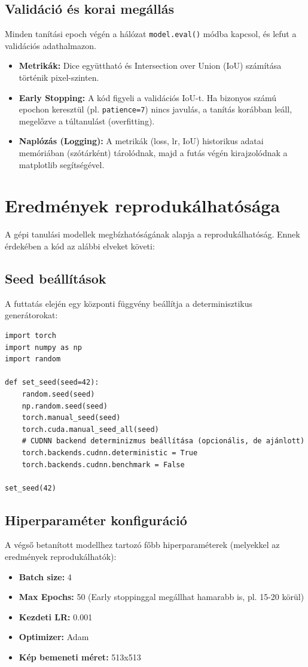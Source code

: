 \documentclass[12pt, a4paper]{report}
\begin{document}
\subsection{Validáció és korai megállás}
Minden tanítási epoch végén a hálózat \texttt{model.eval()} módba kapcsol, és lefut a validációs adathalmazon.
\begin{itemize}
    \item \textbf{Metrikák:} Dice együttható és Intersection over Union (IoU) számítása történik pixel-szinten.
    \item \textbf{Early Stopping:} A kód figyeli a validációs IoU-t. Ha bizonyos számú epochon keresztül (pl. \texttt{patience=7}) nincs javulás, a tanítás korábban leáll, megelőzve a túltanulást (overfitting).
    \item \textbf{Naplózás (Logging):} A metrikák (loss, lr, IoU) historikus adatai memóriában (szótárként) tárolódnak, majd a futás végén kirajzolódnak a matplotlib segítségével.
\end{itemize}

\section{Eredmények reprodukálhatósága}

A gépi tanulási modellek megbízhatóságának alapja a reprodukálhatóság. Ennek érdekében a kód az alábbi elveket követi:

\subsection{Seed beállítások}
A futtatás elején egy központi függvény beállítja a determinisztikus generátorokat:
\begin{verbatim}
import torch
import numpy as np
import random

def set_seed(seed=42):
    random.seed(seed)
    np.random.seed(seed)
    torch.manual_seed(seed)
    torch.cuda.manual_seed_all(seed)
    # CUDNN backend determinizmus beállítása (opcionális, de ajánlott)
    torch.backends.cudnn.deterministic = True
    torch.backends.cudnn.benchmark = False

set_seed(42)
\end{verbatim}

\subsection{Hiperparaméter konfiguráció}
A végső betanított modellhez tartozó főbb hiperparaméterek (melyekkel az eredmények reprodukálhatók):
\begin{itemize}
    \item \textbf{Batch size:} 4
    \item \textbf{Max Epochs:} 50 (Early stoppinggal megállhat hamarabb is, pl. 15-20 körül)
    \item \textbf{Kezdeti LR:} 0.001
    \item \textbf{Optimizer:} Adam
    \item \textbf{Kép bemeneti méret:} 513x513
\end{itemize}
\end{document}

